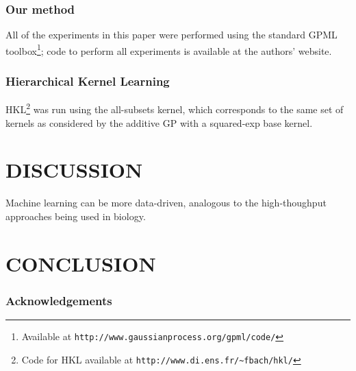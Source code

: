 \documentclass[twoside]{article}
\begin{document}
\subsubsection{Our method}
All of the experiments in this paper were performed using the standard GPML toolbox\footnote{Available at \texttt{http://www.gaussianprocess.org/gpml/code/}}; code to perform all experiments is available at the authors' website.

\subsubsection{Hierarchical Kernel Learning}
HKL\footnote{Code for HKL available at \texttt{http://www.di.ens.fr/\textasciitilde fbach/hkl/}} was run using the all-subsets kernel, which corresponds to the same set of kernels as considered by the additive GP with a squared-exp base kernel.



\section{DISCUSSION}

Machine learning can be more data-driven, analogous to the high-thoughput approaches being used in biology. 


\section{CONCLUSION}


\subsubsection*{Acknowledgements}




\end{document}
